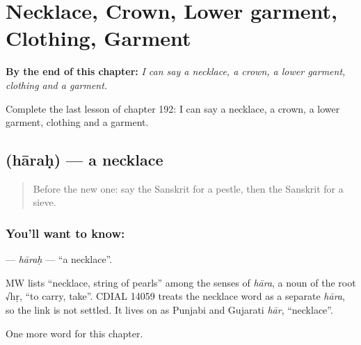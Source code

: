
\chapter{Necklace, Crown, Lower garment, Clothing, Garment}
\label{ch:sa-necklace-crown-lower-garment-clothing-garment}

\begin{chapteropening}
\textbf{By the end of this chapter:} \emph{I can say a necklace, a crown, a lower garment, clothing and a garment.}

Complete the last lesson of chapter 192: I can say a necklace, a crown, a lower garment, clothing and a garment.
\end{chapteropening}

\section[\texorpdfstring{\sk{हारः} (hāraḥ)}{हारः (hāraḥ)}]{ (hāraḥ) — a necklace}

\label{lesson:SA-C192-harah}



\begin{quote}
Before the new one: say the Sanskrit for a pestle, then the Sanskrit for a sieve.
\end{quote}

\subsection*{You'll want to know: }
\textbf{} — \emph{hāraḥ} — \textquotedblleft{}a necklace\textquotedblright{}.

\begin{cousinweb}
MW lists \textquotedblleft{}necklace, string of pearls\textquotedblright{} among the senses of \emph{hāra}, a noun of the root √hṛ, \textquotedblleft{}to carry, take\textquotedblright{}. CDIAL 14059 treats the necklace word as a separate \emph{hāra}, so the link is not settled. It lives on as Punjabi and Gujarati \emph{hār}, \textquotedblleft{}necklace\textquotedblright{}.
\end{cousinweb}

\begin{grammarlens}[title={What you've built}]
One more word for this chapter.
\end{grammarlens}

